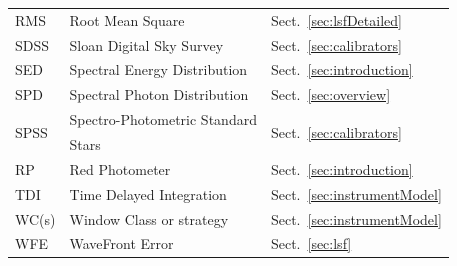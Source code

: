 \documentclass{aa}
\newcommand{\secname}{Sect.}
\newcommand{\secref}[1]{\secname~\ref{sec:#1}}
\begin{document}
\begin{appendix}
\begin{table}[hp]
\begin{tabular}{l|l|l}
RMS & Root Mean Square & \secref{lsfDetailed} \\
SDSS & Sloan Digital Sky Survey &\secref{calibrators} \\
SED & Spectral Energy Distribution   & \secref{introduction} \\
SPD & Spectral Photon Distribution   & \secref{overview} \\
\multirow{2}{*}{SPSS} & Spectro-Photometric Standard   & \multirow{2}{*}{\secref{calibrators}} \\
& Stars & \\
RP & Red Photometer & \secref{introduction} \\
TDI & Time Delayed Integration & \secref{instrumentModel} \\
WC(s) & Window Class or strategy & \secref{instrumentModel} \\
WFE & WaveFront Error & \secref{lsf} \\

\end{tabular}
\end{table}

\end{appendix}
\end{document}
